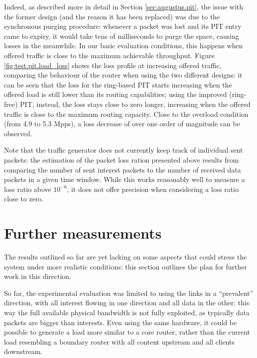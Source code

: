 \documentclass[11pt,a4paper,twoside,titlepage,openany]{book}
\begin{document}
Indeed, as described more in detail in Section \ref{sec:augustus.pit}, the issue with the former design (and the reason it has been replaced) was due to the synchronous purging procedure: whenever a packet was lost and its \gls{PIT} entry came to expiry, it would take tens of milliseconds to purge the space, causing losses in the meanwhile. In our basic evaluation conditions, this happens when offered traffic is close to the maximum achievable throughput. Figure \ref{fig:test.pit.load_loss} shows the loss profile at increasing offered traffic, comparing the behaviour of the router when using the two different designs: it can be seen that the loss for the ring-based PIT starts increasing when the offered load is still lower than its routing capabilities; using the improved (ring-free) PIT, instead, the loss stays close to zero longer, increasing when the offered traffic is close to the maximum routing capacity. Close to the overload condition (from 4.9 to 5.3 Mpps), a loss decrease of over one order of magnitude can be observed.

Note that the traffic generator does not currently keep track of individual sent packets: the estimation of the packet loss ration presented above results from comparing the number of sent interest packets to the number of received data packets in a given time window. While this works reasonably well to measure a loss ratio above $10^{-6}$, it does not offer precision when considering a loss ratio close to zero.


\section{Further measurements}\label{sec:test.todos}

The results outlined so far are yet lacking on some aspects that could stress the system under more realistic conditions: this section outlines the plan for further work in this direction.

So far, the experimental evaluation was limited to using the links in a ``prevalent'' direction, with all interest flowing in one direction and all data in the other: this way the full available physical bandwidth is not fully exploited, as typically data packets are bigger than interests. Even using the same hardware, it could be possible to generate a load more similar to a core router, rather than the current load resembling a boundary router with all content upstream and all clients downstream.
\end{document}
